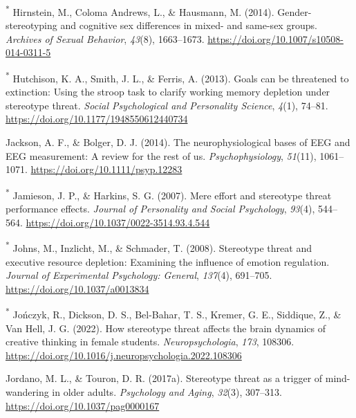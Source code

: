 \documentclass[
  stu, a4paper, 12pt,mask,floatsintext]{apa7}
\newlength{\cslhangindent}
\newenvironment{CSLReferences}[2] %
 {\begin{list}{}{%
  \setlength{\itemindent}{0pt}
  \setlength{\leftmargin}{0pt}
  \setlength{\parsep}{0pt}
  \ifodd #1
   \setlength{\leftmargin}{\cslhangindent}
   \setlength{\itemindent}{-1\cslhangindent}
  \fi
  \setlength{\itemsep}{#2\baselineskip}}}
 {\end{list}}
\begin{document}
\begin{CSLReferences}{1}{0}
\textsuperscript{*} Hirnstein, M., Coloma Andrews, L., \& Hausmann, M. (2014). Gender-stereotyping and cognitive sex differences in mixed- and same-sex groups. \emph{Archives of Sexual Behavior}, \emph{43}(8), 1663--1673. \url{https://doi.org/10.1007/s10508-014-0311-5}

\textsuperscript{*} Hutchison, K. A., Smith, J. L., \& Ferris, A. (2013). Goals can be threatened to extinction: {Using} the stroop task to clarify working memory depletion under stereotype threat. \emph{Social Psychological and Personality Science}, \emph{4}(1), 74--81. \url{https://doi.org/10.1177/1948550612440734}

Jackson, A. F., \& Bolger, D. J. (2014). The neurophysiological bases of {\textsc{EEG}} and {\textsc{EEG}} measurement: {A} review for the rest of us. \emph{Psychophysiology}, \emph{51}(11), 1061--1071. \url{https://doi.org/10.1111/psyp.12283}

\textsuperscript{*} Jamieson, J. P., \& Harkins, S. G. (2007). Mere effort and stereotype threat performance effects. \emph{Journal of Personality and Social Psychology}, \emph{93}(4), 544--564. \url{https://doi.org/10.1037/0022-3514.93.4.544}

\textsuperscript{*} Johns, M., Inzlicht, M., \& Schmader, T. (2008). Stereotype threat and executive resource depletion: {Examining} the influence of emotion regulation. \emph{Journal of Experimental Psychology: General}, \emph{137}(4), 691--705. \url{https://doi.org/10.1037/a0013834}

\textsuperscript{*} Jończyk, R., Dickson, D. S., Bel-Bahar, T. S., Kremer, G. E., Siddique, Z., \& Van Hell, J. G. (2022). How stereotype threat affects the brain dynamics of creative thinking in female students. \emph{Neuropsychologia}, \emph{173}, 108306. \url{https://doi.org/10.1016/j.neuropsychologia.2022.108306}

Jordano, M. L., \& Touron, D. R. (2017a). Stereotype threat as a trigger of mind-wandering in older adults. \emph{Psychology and Aging}, \emph{32}(3), 307--313. \url{https://doi.org/10.1037/pag0000167}


\end{CSLReferences}
\end{document}
